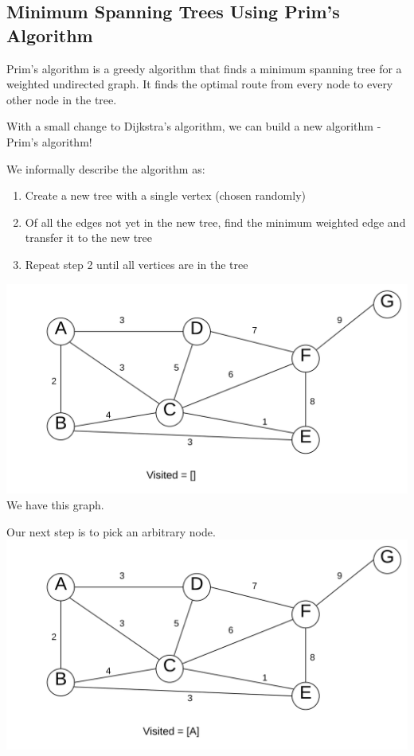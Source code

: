 \documentclass{article}
\begin{document}
\subsection{Minimum Spanning Trees Using Prim's Algorithm}
Prim's algorithm is a greedy algorithm that finds a minimum spanning tree for a weighted undirected graph. It finds the optimal route from every node to every other node in the tree.

With a small change to Dijkstra's algorithm, we can build a new algorithm - Prim's algorithm!

We informally describe the algorithm as:

\begin{enumerate}
    \item Create a new tree with a single vertex (chosen randomly)
    \item Of all the edges not yet in the new tree, find the minimum weighted edge and transfer it to the new tree
    \item Repeat step 2 until all vertices are in the tree
\end{enumerate}
\includegraphics[width=\textwidth,height=\textheight,keepaspectratio]{1.png}
We have this graph. 

Our next step is to pick an arbitrary node. 
\includegraphics[width=\textwidth,height=\textheight,keepaspectratio]{2.png}
\end{document}

